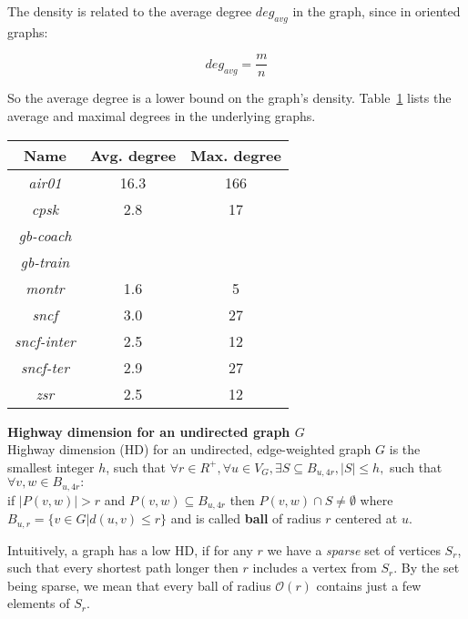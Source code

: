 	\noindent The density is related to the average degree $deg_{avg}$ in the graph, since in oriented graphs:
	
	$$deg_{avg} = \frac{\displaystyle m}{\displaystyle n}$$
	
	\noindent So the average degree is a lower bound on the graph's density. Table~\ref{table:ug_degs} lists the average and maximal degrees in the underlying graphs.
	
	\begin{table}[H]
		\centering
		\begin{tabular}{c|c|c}
			\rowcolor{tablehead}
			\textbf{Name} & \textbf{Avg. degree} & \textbf{Max. degree}\\
			\hline
			\textit{air01} & 16.3 & 166 \\
			\textit{cpsk} & 2.8 & 17 \\
			\textit{gb-coach} &  &  \\
			\textit{gb-train} &  &  \\
			\textit{montr} & 1.6 & 5 \\
			\textit{sncf} & 3.0 & 27 \\
			\textit{sncf-inter} & 2.5 & 12 \\
			\textit{sncf-ter} & 2.9 & 27 \\
			\textit{zsr} & 2.5 & 12 \\
		\end{tabular}
		\label{table:ug_degs}
	\end{table}
	
	\begin{definition}
                \textbf{Highway dimension for an undirected graph $G$} ~\cite{highwaydim10} \\
                Highway dimension (HD) for an undirected, edge-weighted graph $G$ is the smallest integer $h$, such that
                \vskip 10pt
                \indent $\forall r \in R^{+}, \forall u \in V_{G}, \exists S \subseteq B_{u, 4r}, |S| \leq h,$ such that $\forall v, w \in B_{u, 4r}:$ \\
                \indent \indent if $|P(v, w)| > r$ and $P(v, w) \subseteq B_{u, 4r}$ then $P(v, w) \cap S \neq \emptyset$
                \vskip 10pt
                \noindent where $B_{u, r} = \{v \in G | d(u, v) \leq r\}$ and is called \textbf{ball} of radius $r$ centered at $u$.
            \end{definition}

            \noindent Intuitively, a graph has a low HD, if for any $r$ we have a \emph{sparse} set of vertices $S_{r}$, such that every shortest path longer then $r$ includes a vertex from $S_{r}$. By the set being sparse, we mean that every ball of radius $\mathcal{O}(r)$ contains just a few elements of $S_{r}$.

